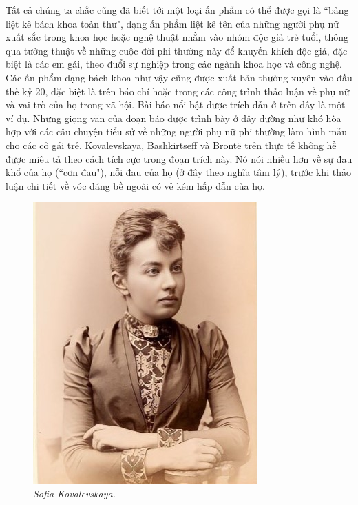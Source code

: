 \begin{multicols}{2}
	Tất cả chúng ta chắc cũng đã biết tới một loại ấn phẩm có thể được gọi là ``bảng liệt kê bách khoa toàn thư", dạng ấn phẩm liệt kê tên của những người phụ nữ xuất sắc trong khoa học hoặc nghệ thuật  nhằm vào nhóm độc giả trẻ tuổi, thông qua tường thuật về những cuộc đời phi thường này để khuyến khích độc giả, đặc biệt là các em gái, theo đuổi sự nghiệp trong các ngành khoa học và công nghệ. Các ấn phẩm dạng bách khoa như vậy cũng được xuất bản thường xuyên vào đầu thế kỷ 20, đặc biệt là trên báo chí hoặc trong các công trình thảo luận về phụ nữ và vai trò của họ trong xã hội. Bài báo nổi bật được trích dẫn ở trên đây là một ví dụ. Nhưng giọng văn của đoạn báo được trình bày ở đây dường như khó hòa hợp với các câu chuyện tiểu sử về những người phụ nữ phi thường làm hình mẫu cho các cô gái trẻ. Kovalevskaya, Bashkirtseff và Brontë trên thực tế không hề được miêu tả theo cách tích cực trong đoạn trích này. Nó nói nhiều hơn về sự đau khổ của họ (``cơn đau"), nỗi đau của họ (ở đây theo nghĩa tâm lý), trước khi thảo luận chi tiết về vóc dáng bề ngoài có vẻ kém hấp dẫn của họ.
	\begin{figure}[H]
		\vspace*{-5pt}
		\centering
		\captionsetup{labelformat= empty, justification=centering}
		\includegraphics[width= 0.75\linewidth]{4}
		\caption{\small\textit{\color{lichsutoanhoc}Sofia Kovalevskaya.}}
		\vspace*{-10pt}
	\end{figure}

\end{multicols}
